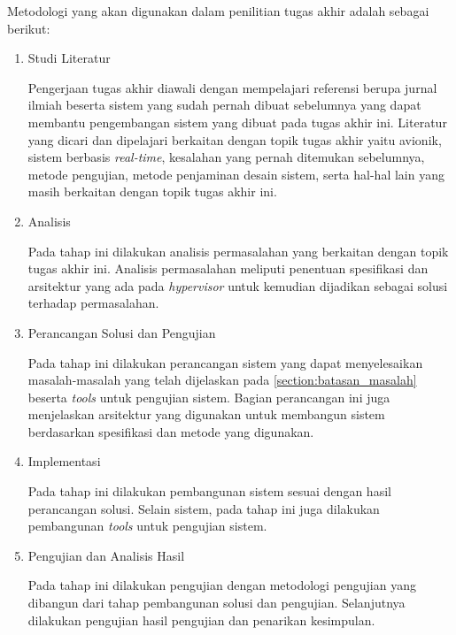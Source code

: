 Metodologi yang akan digunakan dalam penilitian tugas akhir adalah sebagai berikut:

\begin{enumerate}

    \item Studi Literatur

        Pengerjaan tugas akhir diawali dengan mempelajari referensi berupa jurnal ilmiah beserta sistem yang sudah
        pernah dibuat sebelumnya yang dapat membantu pengembangan sistem yang dibuat pada tugas akhir ini.  Literatur
        yang dicari dan dipelajari berkaitan dengan topik tugas akhir yaitu avionik, sistem berbasis \textit{real-time},
        kesalahan yang pernah ditemukan sebelumnya, metode pengujian, metode penjaminan desain sistem, serta hal-hal
        lain yang masih berkaitan dengan topik tugas akhir ini.

    \item Analisis

        Pada tahap ini dilakukan analisis permasalahan yang berkaitan dengan topik tugas akhir ini. Analisis
        permasalahan meliputi penentuan spesifikasi dan arsitektur yang ada pada \textit{hypervisor} untuk kemudian
        dijadikan sebagai solusi terhadap permasalahan.

    \item Perancangan Solusi dan Pengujian

        Pada tahap ini dilakukan perancangan sistem yang dapat menyelesaikan masalah\hyp{}masalah yang telah dijelaskan
        pada \autoref{section:batasan_masalah} beserta \textit{tools} untuk pengujian sistem. Bagian perancangan ini
        juga menjelaskan arsitektur yang digunakan untuk membangun sistem berdasarkan spesifikasi dan metode yang
        digunakan.


    \item Implementasi

        Pada tahap ini dilakukan pembangunan sistem sesuai dengan hasil perancangan solusi. Selain sistem, pada tahap
        ini juga dilakukan pembangunan \textit{tools} untuk pengujian sistem.

    \item Pengujian dan Analisis Hasil

        Pada tahap ini dilakukan pengujian dengan metodologi pengujian yang dibangun dari tahap pembangunan solusi dan
        pengujian. Selanjutnya dilakukan pengujian hasil pengujian dan penarikan kesimpulan.

\end{enumerate}

